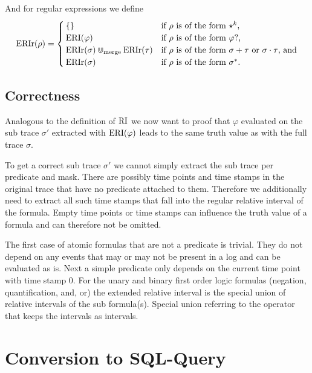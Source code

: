 And for regular expressions we define 
\begin{equation*}
    \operatorname{ERIr}(\rho) =
    \begin{cases}
        \{\} & \text{if $\rho$ is of the form $\star^k$,} \\
        \operatorname{ERI}(\varphi) & \text{if $\rho$ is of the form $\varphi ?$,} \\
        \operatorname{ERIr}(\sigma) \Cup_{\text{merge}} \operatorname{ERIr}(\tau) & \text{if $\rho$ is of the form $\sigma + \tau$ or $\sigma \cdot \tau$, and} \\
        \operatorname{ERIr}(\sigma) & \text{if $\rho$ is of the form $\sigma^*$.}
    \end{cases}
\end{equation*}

\subsection{Correctness}
Analogous to the definition of $\operatorname{RI}$ we now want to proof that $\varphi$ evaluated on the sub trace $\sigma'$ extracted with $\operatorname{ERI}(\varphi)$ leads to the same truth value as with the full trace $\sigma$.

To get a correct sub trace $\sigma'$ we cannot simply extract the sub trace per predicate and mask.
There are possibly time points and time stamps in the original trace that have no predicate attached to them.
Therefore we additionally need to extract all such time stamps that fall into the regular relative interval of the formula.
Empty time points or time stamps can influence the truth value of a formula and can therefore not be omitted.

The first case of atomic formulas that are not a predicate is trivial.
They do not depend on any events that may or may not be present in a log and can be evaluated as is.
Next a simple predicate only depends on the current time point with time stamp $0$.
For the unary and binary first order logic formulas (negation, quantification, and, or) the extended relative interval is the special union of relative intervals of the sub formula(s).
Special union referring to the operator that keeps the intervals as intervals.



\section{Conversion to SQL-Query}


